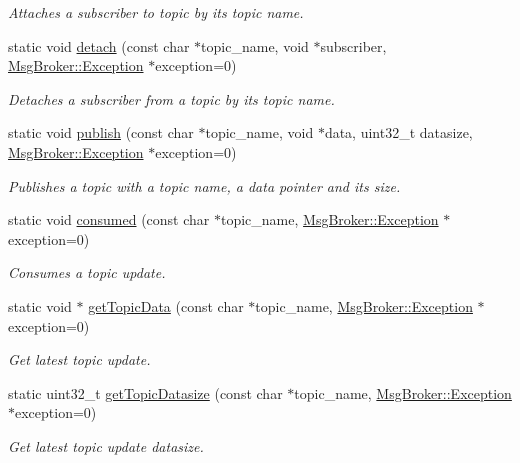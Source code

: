 \begin{DoxyCompactItemize}
\begin{DoxyCompactList}\small\item\em Attaches a subscriber to topic by its topic name. \end{DoxyCompactList}\item 
static void \hyperlink{class_msg_broker_ab82e348bba48890e5976a0e595baab38}{detach} (const char $\ast$topic\-\_\-name, void $\ast$subscriber, \hyperlink{class_msg_broker_a29a59609f9ec3a1b8022f98f228f3c9c}{Msg\-Broker\-::\-Exception} $\ast$exception=0)
\begin{DoxyCompactList}\small\item\em Detaches a subscriber from a topic by its topic name. \end{DoxyCompactList}\item 
static void \hyperlink{class_msg_broker_ac23ee5a60ef26ce2943c4d843f76ffef}{publish} (const char $\ast$topic\-\_\-name, void $\ast$data, uint32\-\_\-t datasize, \hyperlink{class_msg_broker_a29a59609f9ec3a1b8022f98f228f3c9c}{Msg\-Broker\-::\-Exception} $\ast$exception=0)
\begin{DoxyCompactList}\small\item\em Publishes a topic with a topic name, a data pointer and its size. \end{DoxyCompactList}\item 
static void \hyperlink{class_msg_broker_a2fc6d9772fc87ebeb224a5815695781d}{consumed} (const char $\ast$topic\-\_\-name, \hyperlink{class_msg_broker_a29a59609f9ec3a1b8022f98f228f3c9c}{Msg\-Broker\-::\-Exception} $\ast$exception=0)
\begin{DoxyCompactList}\small\item\em Consumes a topic update. \end{DoxyCompactList}\item 
static void $\ast$ \hyperlink{class_msg_broker_ab77a66ce4452b2af044d9c924b6b90a1}{get\-Topic\-Data} (const char $\ast$topic\-\_\-name, \hyperlink{class_msg_broker_a29a59609f9ec3a1b8022f98f228f3c9c}{Msg\-Broker\-::\-Exception} $\ast$exception=0)
\begin{DoxyCompactList}\small\item\em Get latest topic update. \end{DoxyCompactList}\item 
static uint32\-\_\-t \hyperlink{class_msg_broker_a1379f72013b54b16f78960bd577e814a}{get\-Topic\-Datasize} (const char $\ast$topic\-\_\-name, \hyperlink{class_msg_broker_a29a59609f9ec3a1b8022f98f228f3c9c}{Msg\-Broker\-::\-Exception} $\ast$exception=0)
\begin{DoxyCompactList}\small\item\em Get latest topic update datasize. \end{DoxyCompactList}\end{DoxyCompactItemize}


